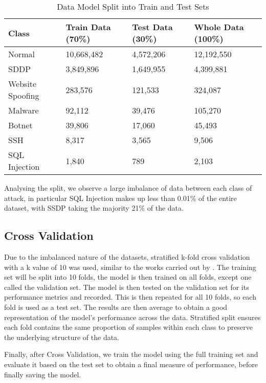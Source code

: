 \begin{table}[H]
\begin{tabular}{llll}
\textbf{Class}   & \textbf{Train Data (70\%)} & \textbf{Test Data (30\%)} & \textbf{Whole Data (100\%)} \\ \hline
Normal           & 10,668,482                       &   4,572,206           & 12,192,550                  \\
SDDP             & 3,849,896                &     1,649,955            & 4,399,881                   \\
Website Spoofing & 283,576            &     121,533       & 324,087                     \\
Malware          &  92,112                     &     39,476               & 105,270                     \\
Botnet           & 39,806                    &     17,060          & 45,493                      \\
SSH              & 8,317              &       3,565             & 9,506                       \\
SQL Injection    & 1,840                &     789                  & 2,103                  \\ \hline
\end{tabular}
\caption{Data Model Split into Train and Test Sets}
\label{tab:split_data}
\end{table}

Analysing the split, we observe a large imbalance of data between each class of attack, in particular SQL Injection makes up less than 0.01\% of the entire dataset, with SSDP taking the majority 21\% of the data. 


\subsection{Cross Validation}

Due to the imbalanced nature of the datasets, stratified k-fold cross validation with a k value of 10 was used, similar to the works carried out by \citeauthor{s22155633}. The training set will be split into 10 folds, the model is then trained on all folds, except one called the validation set. The model is then tested on the validation set for its performance metrics and recorded. This is then repeated for all 10 folds, so each fold is used as a test set. The results are then average to obtain a good representation of the model's performance across the data. Stratified split ensures each fold contains the same proportion of samples within each class to preserve the underlying structure of the data. 

Finally, after Cross Validation, we train the model using the full training set and evaluate it based on the test set to obtain a final measure of performance, before finally saving the model.